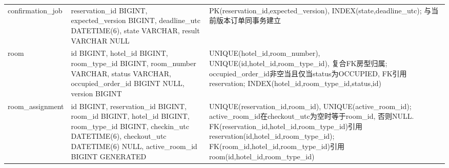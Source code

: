 \documentclass[cn,nofont,11pt,a4paper]{elegantpaper}
\begin{document}
\begin{longtable}{>{\RaggedRight\arraybackslash}p{}>{\RaggedRight\arraybackslash}p{}>{\RaggedRight\arraybackslash}p{}}
confirmation\_\allowbreak{}\allowbreak{}job & reservation\_\allowbreak{}\allowbreak{}id BIGINT, expected\_\allowbreak{}\allowbreak{}version BIGINT, deadline\_\allowbreak{}\allowbreak{}utc DATETIME(6), state VARCHAR, result VARCHAR NULL & PK(reservation\_\allowbreak{}\allowbreak{}id,expected\_\allowbreak{}\allowbreak{}version), INDEX(state,deadline\_\allowbreak{}\allowbreak{}utc); 与当前版本订单同事务建立 \\
room & id BIGINT, hotel\_\allowbreak{}\allowbreak{}id BIGINT, room\_\allowbreak{}\allowbreak{}type\_\allowbreak{}\allowbreak{}id BIGINT, room\_\allowbreak{}\allowbreak{}number VARCHAR, status VARCHAR, occupied\_\allowbreak{}\allowbreak{}order\_\allowbreak{}\allowbreak{}id BIGINT NULL, version BIGINT & UNIQUE(hotel\_\allowbreak{}\allowbreak{}id,room\_\allowbreak{}\allowbreak{}number), UNIQUE(id,hotel\_\allowbreak{}\allowbreak{}id,room\_\allowbreak{}\allowbreak{}type\_\allowbreak{}\allowbreak{}id), 复合FK房型归属; occupied\_\allowbreak{}\allowbreak{}order\_\allowbreak{}\allowbreak{}id非空当且仅当status为OCCUPIED, FK引用reservation; INDEX(hotel\_\allowbreak{}\allowbreak{}id,room\_\allowbreak{}\allowbreak{}type\_\allowbreak{}\allowbreak{}id,status,id) \\
room\_\allowbreak{}\allowbreak{}assignment & id BIGINT, reservation\_\allowbreak{}\allowbreak{}id BIGINT, room\_\allowbreak{}\allowbreak{}id BIGINT, hotel\_\allowbreak{}\allowbreak{}id BIGINT, room\_\allowbreak{}\allowbreak{}type\_\allowbreak{}\allowbreak{}id BIGINT, checkin\_\allowbreak{}\allowbreak{}utc DATETIME(6), checkout\_\allowbreak{}\allowbreak{}utc DATETIME(6) NULL, active\_\allowbreak{}\allowbreak{}room\_\allowbreak{}\allowbreak{}id BIGINT GENERATED & UNIQUE(reservation\_\allowbreak{}\allowbreak{}id,room\_\allowbreak{}\allowbreak{}id), UNIQUE(active\_\allowbreak{}\allowbreak{}room\_\allowbreak{}\allowbreak{}id); active\_\allowbreak{}\allowbreak{}room\_\allowbreak{}\allowbreak{}id在checkout\_\allowbreak{}\allowbreak{}utc为空时等于room\_\allowbreak{}\allowbreak{}id, 否则NULL. FK(reservation\_\allowbreak{}\allowbreak{}id,hotel\_\allowbreak{}\allowbreak{}id,room\_\allowbreak{}\allowbreak{}type\_\allowbreak{}\allowbreak{}id)引用reservation(id,hotel\_\allowbreak{}\allowbreak{}id,room\_\allowbreak{}\allowbreak{}type\_\allowbreak{}\allowbreak{}id); FK(room\_\allowbreak{}\allowbreak{}id,hotel\_\allowbreak{}\allowbreak{}id,room\_\allowbreak{}\allowbreak{}type\_\allowbreak{}\allowbreak{}id)引用room(id,hotel\_\allowbreak{}\allowbreak{}id,room\_\allowbreak{}\allowbreak{}type\_\allowbreak{}\allowbreak{}id) \\

\end{longtable}
\end{document}
